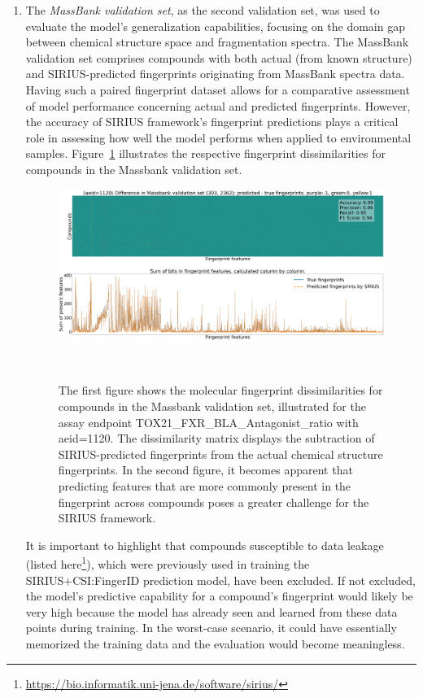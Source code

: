 \begin{enumerate}
    \item The \emph{MassBank validation set}, as the second validation set, was used to evaluate the model's generalization capabilities, focusing on the domain gap between chemical structure space and fragmentation spectra. The MassBank validation set comprises compounds with both actual (from known structure) and SIRIUS-predicted fingerprints originating from MassBank spectra data. Having such a paired fingerprint dataset allows for a comparative assessment of model performance concerning actual and predicted fingerprints. However, the accuracy of SIRIUS framework's fingerprint predictions plays a critical role in assessing how well the model performs when applied to environmental samples. Figure~\ref{fig:massbank_fingerprint_difference} illustrates the respective fingerprint dissimilarities for compounds in the Massbank validation set.
    \begin{figure}[h]
        \centering
        \includegraphics[width=1\textwidth]{figures/massbank_fingerprint_difference.png}
        \caption{The first figure shows the molecular fingerprint dissimilarities for compounds in the Massbank validation set, illustrated for the assay endpoint TOX21\_FXR\_BLA\_Antagonist\_ratio with aeid=1120. The dissimilarity matrix displays the subtraction of SIRIUS-predicted fingerprints from the actual chemical structure fingerprints. In the second figure, it becomes apparent that predicting features that are more commonly present in the fingerprint across compounds poses a greater challenge for the SIRIUS framework.}
    ~\label{fig:massbank_fingerprint_difference}
    \end{figure}

    It is important to highlight that compounds susceptible to data leakage (listed here\footnote{\url{https://bio.informatik.uni-jena.de/software/sirius/}}), which were previously used in training the SIRIUS+CSI:FingerID prediction model, have been excluded. If not excluded, the model's predictive capability for a compound's fingerprint would likely be very high because the model has already seen and learned from these data points during training. In the worst-case scenario, it could have essentially memorized the training data and the evaluation would become meaningless. 


\end{enumerate}
